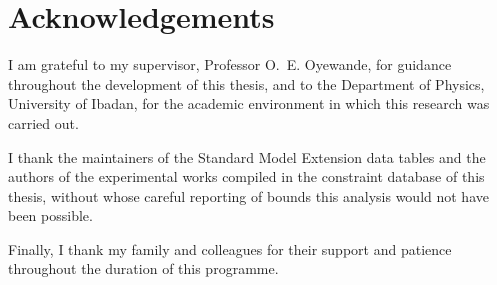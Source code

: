 \chapter*{Acknowledgements}

I am grateful to my supervisor, Professor O.~E. Oyewande, for guidance
throughout the development of this thesis, and to the Department of
Physics, University of Ibadan, for the academic environment in which this
research was carried out.

I thank the maintainers of the Standard Model Extension data tables and the
authors of the experimental works compiled in the constraint database of
this thesis, without whose careful reporting of bounds this analysis would
not have been possible.

Finally, I thank my family and colleagues for their support and patience
throughout the duration of this programme.
